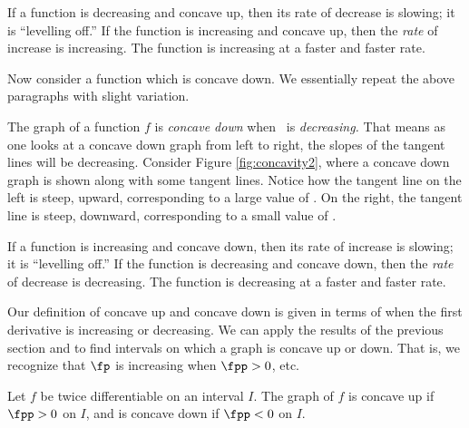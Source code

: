 If a function is decreasing and concave up, then its rate of decrease is slowing; it is ``levelling off.''  If the  function is increasing and concave up, then the \textit{rate} of increase is increasing.  The function is increasing at a faster and faster rate.

Now consider a function which is concave down. We essentially repeat the above paragraphs with slight variation.

The graph of a function $f$ is \textit{concave down}  when \fp\ is \textit{decreasing.} That means as one looks at a concave down graph from left to right, the slopes of the tangent lines will be decreasing. Consider Figure \ref{fig:concavity2}, where a concave down graph is shown along with some tangent lines. Notice how the tangent line on the left is  steep, upward, corresponding to a large value of \fp. On the right, the tangent line is steep, downward, corresponding to a small value of \fp.%

\enlargethispage{\baselineskip}

If a function is increasing and concave down, then its rate of increase is slowing; it is ``levelling off.''  If the function is decreasing and concave down, then the \textit{rate} of decrease is decreasing.  The function is decreasing at a faster and faster rate.


Our definition of concave up and concave down is given in terms of when the first derivative is increasing or decreasing. We can apply the results of the previous section and to find intervals on which a graph is concave up or down. That is, we recognize that $\fp$ is increasing when $\fpp>0$, etc. 

%
{Let $f$ be twice differentiable on an interval $I$. The graph of $f$ is concave up if $\fpp>0$ on $I$, and is concave down if $\fpp<0$ on $I$. 
}


